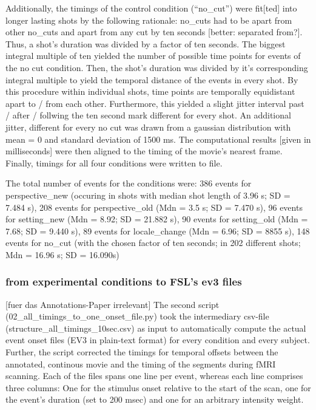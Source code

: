 \documentclass[10pt,a4paper,twocolumn]{article}
\begin{document}
Additionally, the timings of the control condition (``no\_cut'')
were fit{[}ted{]} into longer lasting shots by the following rationale:
no\_cuts had to be apart from other no\_cuts and apart from any cut
by ten seconds {[}better: separated from?{]}. Thus, a shot's duration
was divided by a factor of ten seconds. The biggest integral multiple
of ten yielded the number of possible time points for events of the
no cut condition. Then, the shot's duration was divided by it's corresponding
integral multiple to yield the temporal distance of the events in
every shot. By this procedure within individual shots, time points
are temporally equidistant apart to / from each other. Furthermore,
this yielded a slight jitter interval past / after / follwing the
ten second mark different for every shot. An additional jitter, different
for every no cut was drawn from a gaussian distribution with mean
= 0 and standard deviation of 1500 ms. The computational results {[}given
in milliseconds{]} were then aligned to the timing of the movie's
nearest frame. Finally, timings for all four conditions were written
to file. 

The total number of events for the conditions were: 386 events for
perspective\_new (occuring in shots with median shot length of 3.96
s; SD = 7.484 s), 208 events for perspective\_old (Mdn = 3.5 s; SD
= 7.470 s), 96 events for setting\_new (Mdn = 8.92; SD = 21.882 s),
90 events for setting\_old (Mdn = 7.68; SD = 9.440 s), 89 events for
locale\_change (Mdn = 6.96; SD = 8855 s), 148 events for no\_cut (with
the chosen factor of ten seconds; in 202 different shots; Mdn = 16.96
s; SD = 16.090s)


\subsubsection{from experimental conditions to FSL's ev3 files }
{[fuer das Annotations-Paper irrelevant]} The second script (02\_all\_timings\_to\_one\_onset\_file.py) took the intermediary csv-file (structure\_all\_timings\_10sec.csv)
as input to automatically compute the actual event onset files (EV3
in plain-text format) for every condition and every subject. Further,
the script corrected the timings for temporal offsets between the
annotated, continous movie and the timing of the segments during fMRI
scanning. Each of the files spans one line per event, whereas each
line comprises three columns: One for the stimulus onset relative
to the start of the scan, one for the event's duration (set to 200
msec) and one for an arbitrary intensity weight.
\end{document}
